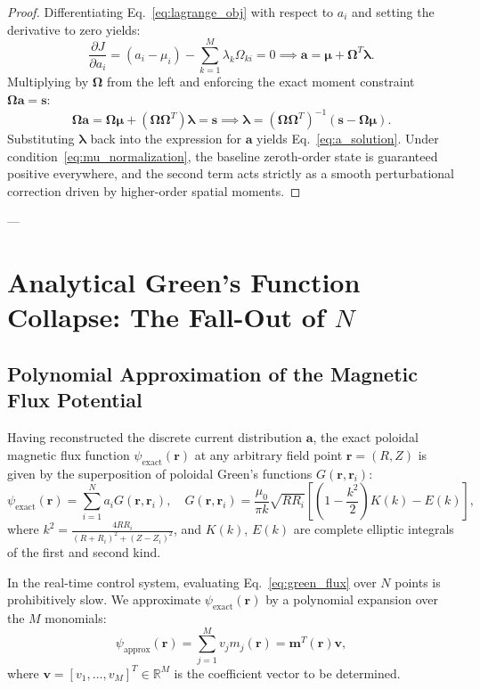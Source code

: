 \documentclass[11pt,a4paper]{article}
\begin{document}
\begin{proof}
Differentiating Eq.~\eqref{eq:lagrange_obj} with respect to $a_i$ and setting the derivative to zero yields:
\begin{equation}
    \frac{\partial J}{\partial a_i} = (a_i - \mu_i) - \sum_{k=1}^M \lambda_k \Omega_{ki} = 0 \implies \bm{a} = \bm{\mu} + \bm{\Omega}^T \bm{\lambda}.
\end{equation}
Multiplying by $\bm{\Omega}$ from the left and enforcing the exact moment constraint $\bm{\Omega}\bm{a} = \bm{s}$:
\begin{equation}
    \bm{\Omega}\bm{a} = \bm{\Omega}\bm{\mu} + (\bm{\Omega}\bm{\Omega}^T)\bm{\lambda} = \bm{s} \implies \bm{\lambda} = (\bm{\Omega}\bm{\Omega}^T)^{-1} (\bm{s} - \bm{\Omega}\bm{\mu}).
\end{equation}
Substituting $\bm{\lambda}$ back into the expression for $\bm{a}$ yields Eq.~\eqref{eq:a_solution}. Under condition~\eqref{eq:mu_normalization}, the baseline zeroth-order state is guaranteed positive everywhere, and the second term acts strictly as a smooth perturbational correction driven by higher-order spatial moments.
\end{proof}

---

\section{Analytical Green's Function Collapse: The Fall-Out of $N$}

\subsection{Polynomial Approximation of the Magnetic Flux Potential}
Having reconstructed the discrete current distribution $\bm{a}$, the exact poloidal magnetic flux function $\psi_{\mathrm{exact}}(\bm{r})$ at any arbitrary field point $\bm{r} = (R,Z)$ is given by the superposition of poloidal Green's functions $G(\bm{r}, \bm{r}_i)$:
\begin{equation}
    \psi_{\mathrm{exact}}(\bm{r}) = \sum_{i=1}^N a_i G(\bm{r}, \bm{r}_i), \quad G(\bm{r}, \bm{r}_i) = \frac{\mu_0}{\pi k} \sqrt{R R_i} \left[ \left(1 - \frac{k^2}{2}\right) K(k) - E(k) \right],
    \label{eq:green_flux}
\end{equation}
where $k^2 = \frac{4 R R_i}{(R + R_i)^2 + (Z - Z_i)^2}$, and $K(k)$, $E(k)$ are complete elliptic integrals of the first and second kind.

In the real-time control system, evaluating Eq.~\eqref{eq:green_flux} over $N$ points is prohibitively slow. We approximate $\psi_{\mathrm{exact}}(\bm{r})$ by a polynomial expansion over the $M$ monomials:
\begin{equation}
    \psi_{\mathrm{approx}}(\bm{r}) = \sum_{j=1}^M v_j m_j(\bm{r}) = \bm{m}^T(\bm{r}) \bm{v},
    \label{eq:psi_approx}
\end{equation}
where $\bm{v} = [v_1, \dots, v_M]^T \in \mathbb{R}^M$ is the coefficient vector to be determined.
\end{document}
